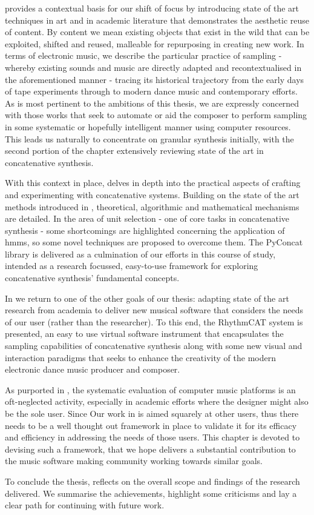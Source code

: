  provides a contextual basis for our shift of focus by introducing state of the art techniques in art and in academic literature that demonstrates the aesthetic reuse of content. By content we mean existing objects that exist in the wild that can be exploited, shifted and reused, malleable for repurposing in creating new work. In terms of electronic music, we describe the particular practice of sampling - whereby existing sounds and music are directly adapted and recontextualised in the aforementioned manner - tracing its historical trajectory from the early days of tape experiments through to modern dance music and contemporary efforts. As is most pertinent to the ambitions of this thesis, we are expressly concerned with those works that seek to automate or aid the composer to perform sampling in some systematic or hopefully intelligent manner using computer resources. This leads us naturally to concentrate on granular synthesis initially, with the second portion of the chapter extensively reviewing state of the art in concatenative synthesis.

With this context in place,  delves in depth into the practical aspects of crafting and experimenting with concatenative systems. Building on the state of the art methods introduced in , theoretical, algorithmic and mathematical mechanisms are detailed. In the area of unit selection - one of core tasks in concatenative synthesis - some shortcomings are highlighted concerning the application of \acrfull{hmm}s, so some novel techniques are proposed to overcome them. The PyConcat library is delivered as a culmination of our efforts in this course of study, intended as a research focussed, easy-to-use framework for exploring concatenative synthesis’ fundamental concepts.

In  we return to one of the other goals of our thesis: adapting state of the art research from academia to deliver new musical software that considers the needs of our user (rather than the researcher). To this end, the RhythmCAT system is presented, an easy to use virtual software instrument that encapsulates the sampling capabilities of concatenative synthesis along with some new visual and interaction paradigms that seeks to enhance the creativity of the modern electronic dance music producer and composer. 

As purported in , the systematic evaluation of computer music platforms is an oft-neglected activity, especially in academic efforts where the designer might also be the sole user. Since Our work in  is aimed squarely at other users, thus there needs to be a well thought out framework in place to validate it for its efficacy and efficiency in addressing the needs of those users. This chapter is devoted to devising such a framework, that we hope delivers a substantial contribution to the music software making community working towards similar goals.

To conclude the thesis,  reflects on the overall scope and findings of the research delivered. We summarise the achievements, highlight some criticisms and lay a clear path for continuing with future work. 


 
